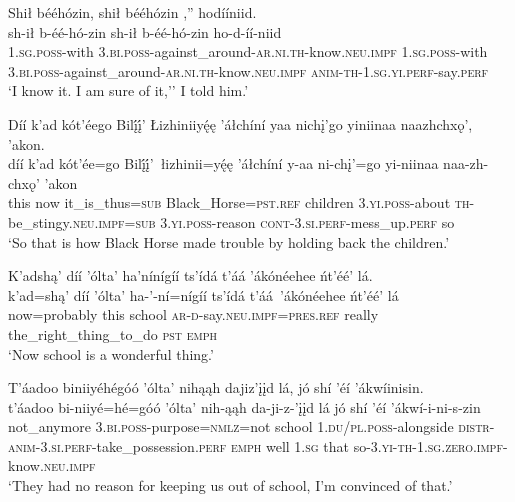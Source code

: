 \newpage
\ea\label{ex:text3-8-7}
Shił bééhózin, shił bééhózin ,'' hodííniid.\\
\gll sh-ił	b-éé-hó-zin	sh-ił	b-éé-hó-zin	ho-d-íí-niid\\
     1.\textsc{sg}.\textsc{poss}-with	3.\textsc{bi}.\textsc{poss}-against\_around-\textsc{ar}.\textsc{ni}.\textsc{th}-know.\textsc{neu}.\textsc{impf}	1.\textsc{sg}.\textsc{poss}-with	3.\textsc{bi}.\textsc{poss}-against\_around-\textsc{ar}.\textsc{ni}.\textsc{th}-know.\textsc{neu}.\textsc{impf}	\textsc{anim}-\textsc{th}-1.\textsc{sg}.\textsc{yi}.\textsc{perf}-say.\textsc{perf}\\
\glt `I know it. I am sure of it,'' I told him.'
\z

\ea\label{ex:text3-8-8}
Díí k’ad kót’éego Bilį́į́’ Łizhiniiyę́ę ’áłchíní yaa nichį’go yiniinaa naazhchxǫ’, ’akon.\\
\gll díí	k’ad	kót’ée=go	Bilį́į́’~{łizhinii=yę́ę}	’áłchíní	y-aa	ni-chį’=go	yi-niinaa	naa-zh-chxǫ’	’akon\\
     this	now	it\_is\_thus=\textsc{sub}	Black\_Horse=\textsc{pst}.\textsc{ref}	children	3.\textsc{yi}.\textsc{poss}-about	\textsc{th}-be\_stingy.\textsc{neu}.\textsc{impf}=\textsc{sub}	3.\textsc{yi}.\textsc{poss}-reason	\textsc{cont}-3.\textsc{si}.\textsc{perf}-mess\_up.\textsc{perf}	so\\
\glt `So that is how Black Horse made trouble by holding back the children.'
\z

\ea\label{ex:text3-9-1}
K’adshą’ díí ’ólta’ ha’nínígíí ts’ídá t’áá ’ákónéehee ńt’éé’ lá.\\
\gll k’ad=shą’	díí	’ólta’	ha-’-ní=nígíí	ts’ídá	t’áá~{’ákónéehee}	ńt’éé’	lá\\
     now=probably	this	school	\textsc{ar}-\textsc{d}-say.\textsc{neu}.\textsc{impf}=\textsc{pres}.\textsc{ref}	really	the\_right\_thing\_to\_do	\textsc{pst}	\textsc{emph}\\
\glt `Now school is a wonderful thing.'
\z

\ea\label{ex:text3-9-2}
T’áadoo biniiyéhégóó ’ólta’ nihąąh dajiz’įįd lá, jó shí ’éí ’ákwíinisin.\\
\gll t’áadoo	bi-niiyé=hé=góó	’ólta’	nih-ąąh	da-ji-z-’įįd	lá	jó	shí	’éí	’ákwí-i-ni-s-zin\\
     not\_anymore	3.\textsc{bi}.\textsc{poss}-purpose=\textsc{nmlz}=not	school	1.\textsc{du}/\textsc{pl}.\textsc{poss}-alongside	\textsc{distr}-\textsc{anim}-3.\textsc{si}.\textsc{perf}-take\_possession.\textsc{perf}	\textsc{emph}	well	1.\textsc{sg}	that	so-3.\textsc{yi}-\textsc{th}-1.\textsc{sg}.\textsc{zero}.\textsc{impf}-know.\textsc{neu}.\textsc{impf}\\
\glt `They had no reason for keeping us out of school, I'm convinced of that.'
\z

